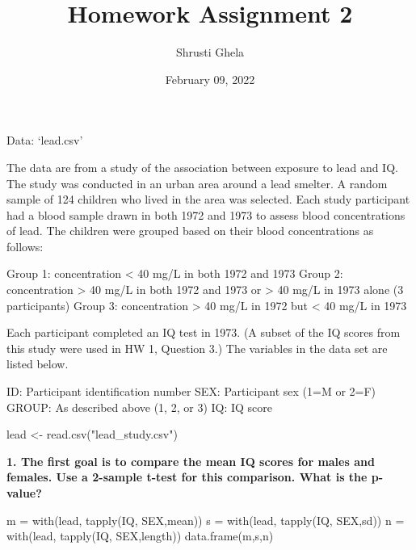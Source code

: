 \documentclass[
]{article}
\title{Homework Assignment 2}
\author{Shrusti Ghela}
\date{February 09, 2022}
\newenvironment{Shaded}{\begin{snugshade}}{\end{snugshade}}
\newcommand{\FunctionTok}[1]{\textcolor[rgb]{0.00,0.00,0.00}{#1}}
\newcommand{\NormalTok}[1]{#1}
\newcommand{\OtherTok}[1]{\textcolor[rgb]{0.56,0.35,0.01}{#1}}
\newcommand{\StringTok}[1]{\textcolor[rgb]{0.31,0.60,0.02}{#1}}
\begin{document}
\maketitle

Data: `lead.csv'

The data are from a study of the association between exposure to lead
and IQ. The study was conducted in an urban area around a lead smelter.
A random sample of 124 children who lived in the area was selected. Each
study participant had a blood sample drawn in both 1972 and 1973 to
assess blood concentrations of lead. The children were grouped based on
their blood concentrations as follows:

Group 1: concentration \textless{} 40 mg/L in both 1972 and 1973 Group
2: concentration \textgreater{} 40 mg/L in both 1972 and 1973 or
\textgreater{} 40 mg/L in 1973 alone (3 participants) Group 3:
concentration \textgreater{} 40 mg/L in 1972 but \textless{} 40 mg/L in
1973

Each participant completed an IQ test in 1973. (A subset of the IQ
scores from this study were used in HW 1, Question 3.) The variables in
the data set are listed below.

ID: Participant identification number SEX: Participant sex (1=M or 2=F)
GROUP: As described above (1, 2, or 3) IQ: IQ score

\begin{Shaded}
\begin{Highlighting}[]
\NormalTok{lead }\OtherTok{\textless{}{-}} \FunctionTok{read.csv}\NormalTok{(}\StringTok{"lead\_study.csv"}\NormalTok{)}
\end{Highlighting}
\end{Shaded}

\textbf{1. The first goal is to compare the mean IQ scores for males and
females. Use a 2-sample t-test for this comparison. What is the
p-value?}

\begin{Shaded}
\begin{Highlighting}[]
\NormalTok{m }\OtherTok{=} \FunctionTok{with}\NormalTok{(lead, }\FunctionTok{tapply}\NormalTok{(IQ, SEX,mean))}
\NormalTok{s }\OtherTok{=} \FunctionTok{with}\NormalTok{(lead, }\FunctionTok{tapply}\NormalTok{(IQ, SEX,sd))}
\NormalTok{n }\OtherTok{=} \FunctionTok{with}\NormalTok{(lead, }\FunctionTok{tapply}\NormalTok{(IQ, SEX,length))}
\FunctionTok{data.frame}\NormalTok{(m,s,n)}
\end{Highlighting}
\end{Shaded}
\end{document}
